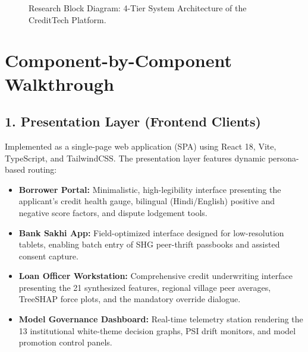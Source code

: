 \documentclass[11pt,a4paper,oneside]{report}
\begin{document}
\begin{figure}[H]
\begin{tikzpicture}[
  scale=0.86, every node/.style={transform shape},
  node distance=1.0cm and 0.5cm, auto
]
\end{tikzpicture}
\caption{Research Block Diagram: 4-Tier System Architecture of the CreditTech Platform.}
\label{fig:system_architecture_diagram}
\end{figure}

\section{Component-by-Component Walkthrough}

\subsection{1. Presentation Layer (Frontend Clients)}
Implemented as a single-page web application (SPA) using React 18, Vite, TypeScript, and TailwindCSS. The presentation layer features dynamic persona-based routing:
\begin{itemize}
  \item \textbf{Borrower Portal:} Minimalistic, high-legibility interface presenting the applicant's credit health gauge, bilingual (Hindi/English) positive and negative score factors, and dispute lodgement tools.
  \item \textbf{Bank Sakhi App:} Field-optimized interface designed for low-resolution tablets, enabling batch entry of SHG peer-thrift passbooks and assisted consent capture.
  \item \textbf{Loan Officer Workstation:} Comprehensive credit underwriting interface presenting the 21 synthesized features, regional village peer averages, TreeSHAP force plots, and the mandatory override dialogue.
  \item \textbf{Model Governance Dashboard:} Real-time telemetry station rendering the 13 institutional white-theme decision graphs, PSI drift monitors, and model promotion control panels.
\end{itemize}
\end{document}
